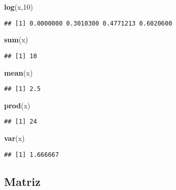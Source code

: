 \documentclass[]{article}
\newenvironment{Shaded}{\begin{snugshade}}{\end{snugshade}}
\newcommand{\KeywordTok}[1]{\textcolor[rgb]{0.13,0.29,0.53}{\textbf{#1}}}
\newcommand{\DecValTok}[1]{\textcolor[rgb]{0.00,0.00,0.81}{#1}}
\newcommand{\NormalTok}[1]{#1}
\begin{document}
\begin{Shaded}
\begin{Highlighting}[]
\KeywordTok{log}\NormalTok{(x,}\DecValTok{10}\NormalTok{)}
\end{Highlighting}
\end{Shaded}

\begin{verbatim}
## [1] 0.0000000 0.3010300 0.4771213 0.6020600
\end{verbatim}

\begin{Shaded}
\begin{Highlighting}[]
\KeywordTok{sum}\NormalTok{(x)}
\end{Highlighting}
\end{Shaded}

\begin{verbatim}
## [1] 10
\end{verbatim}

\begin{Shaded}
\begin{Highlighting}[]
\KeywordTok{mean}\NormalTok{(x)}
\end{Highlighting}
\end{Shaded}

\begin{verbatim}
## [1] 2.5
\end{verbatim}

\begin{Shaded}
\begin{Highlighting}[]
\KeywordTok{prod}\NormalTok{(x)}
\end{Highlighting}
\end{Shaded}

\begin{verbatim}
## [1] 24
\end{verbatim}

\begin{Shaded}
\begin{Highlighting}[]
\KeywordTok{var}\NormalTok{(x)}
\end{Highlighting}
\end{Shaded}

\begin{verbatim}
## [1] 1.666667
\end{verbatim}

\subsection{Matriz}\label{matriz}
\end{document}
